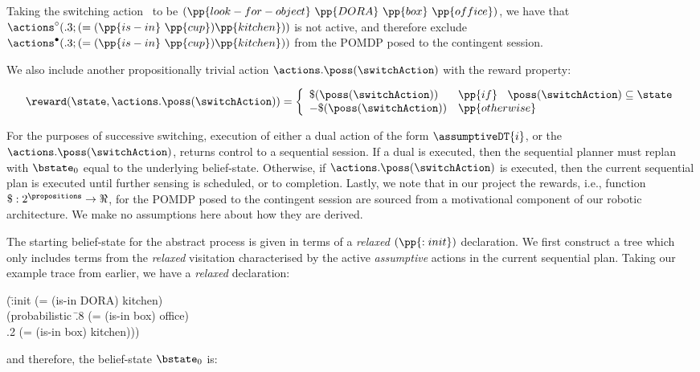 \noindent Taking the switching action \switchAction\ to be
$(\pp{look-for-object}~\pp{DORA}~\pp{box}~\pp{office})$, we have that
$\actions^{\circ}(.3;(=(\pp{is-in}~\pp{cup})\pp{kitchen}))$ is not
active, and therefore exclude
$\actions^{\bullet}(.3;(=(\pp{is-in}~\pp{cup})\pp{kitchen}))$ from the
POMDP posed to the contingent session. 

We also include another propositionally trivial action
$\actions.\poss(\switchAction)$ with the reward property:

\[
\reward(\state, \actions.\poss(\switchAction)) = \bigg\{ \begin{array}{ll}
\$(\poss(\switchAction)) & \pp{if}~\;\; \poss(\switchAction) \subseteq \state \\
-\$(\poss(\switchAction)) & \pp{otherwise} \\
\end{array}
\]

For the purposes of successive switching, execution of either a dual
action of the form $\assumptiveDT{i}$, or the
$\actions.\poss(\switchAction)$, returns control to a sequential
session. If a dual is executed, then the sequential planner must
replan with $\bstate_0$ equal to the underlying
belief-state. Otherwise, if $\actions.\poss(\switchAction)$ is
executed, then the current sequential plan is executed until further
sensing is scheduled, or to completion. Lastly, we note that in our
project the rewards, i.e., function $\$:2^\propositions\to\Re$, for
the POMDP posed to the contingent session are sourced from a
motivational component of our robotic architecture. We make no
assumptions here about how they are derived.

The starting belief-state for the abstract process is given in terms
of a {\em relaxed} $(\pp{:init})$ declaration.  We first construct a
tree which only includes terms from the {\em relaxed} visitation
characterised by the active {\em assumptive} actions in the current
sequential plan. Taking our example trace from earlier, we have a {\em
relaxed} declaration:

\small
\begin{tabtt}
(\=:init (= (is-in DORA) kitchen) \+ \\
       (probabilistic \=.8 (= (is-in box) office)  \\
		      \>.2 (= (is-in box) kitchen))) \\
\end{tabtt}
\normalsize

\noindent and therefore, the belief-state $\bstate_0$ is:

